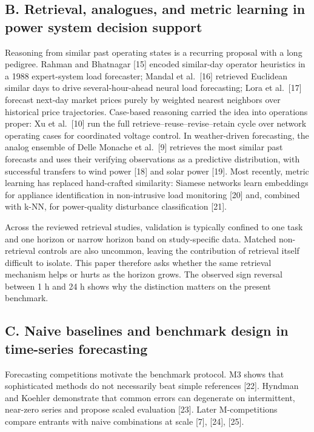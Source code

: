 \documentclass[
  10pt,
  a4paper,
]{article}
\begin{document}
\subsection{B. Retrieval, analogues, and metric learning in power system
decision
support}\label{b.-retrieval-analogues-and-metric-learning-in-power-system-decision-support}

Reasoning from similar past operating states is a recurring proposal
with a long pedigree. Rahman and Bhatnagar {[}15{]} encoded similar-day
operator heuristics in a 1988 expert-system load forecaster; Mandal et
al.~{[}16{]} retrieved Euclidean similar days to drive
several-hour-ahead neural load forecasting; Lora et al.~{[}17{]}
forecast next-day market prices purely by weighted nearest neighbors
over historical price trajectories. Case-based reasoning carried the
idea into operations proper: Xu et al.~{[}10{]} run the full
retrieve--reuse--revise--retain cycle over network operating cases for
coordinated voltage control. In weather-driven forecasting, the analog
ensemble of Delle Monache et al.~{[}9{]} retrieves the most similar past
forecasts and uses their verifying observations as a predictive
distribution, with successful transfers to wind power {[}18{]} and solar
power {[}19{]}. Most recently, metric learning has replaced hand-crafted
similarity: Siamese networks learn embeddings for appliance
identification in non-intrusive load monitoring {[}20{]} and, combined
with k-NN, for power-quality disturbance classification {[}21{]}.

Across the reviewed retrieval studies, validation is typically confined
to one task and one horizon or narrow horizon band on study-specific
data. Matched non-retrieval controls are also uncommon, leaving the
contribution of retrieval itself difficult to isolate. This paper
therefore asks whether the same retrieval mechanism helps or hurts as
the horizon grows. The observed sign reversal between 1 h and 24 h shows
why the distinction matters on the present benchmark.

\subsection{C. Naive baselines and benchmark design in time-series
forecasting}\label{c.-naive-baselines-and-benchmark-design-in-time-series-forecasting}

Forecasting competitions motivate the benchmark protocol. M3 shows that
sophisticated methods do not necessarily beat simple references
{[}22{]}. Hyndman and Koehler demonstrate that common errors can
degenerate on intermittent, near-zero series and propose scaled
evaluation {[}23{]}. Later M-competitions compare entrants with naive
combinations at scale {[}7{]}, {[}24{]}, {[}25{]}.
\end{document}
